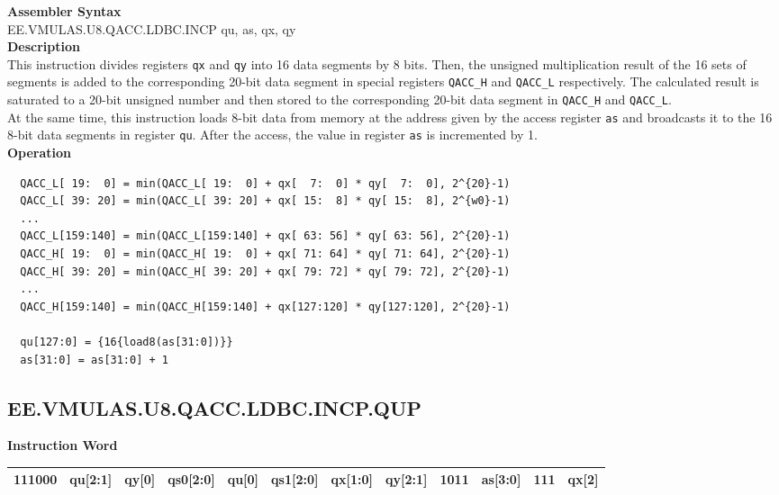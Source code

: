 \textbf{Assembler Syntax} \\
EE.VMULAS.U8.QACC.LDBC.INCP qu, as, qx, qy \\
\textbf{Description} \\
This instruction divides registers \lstinline{qx} and \lstinline{qy} into 16 data segments by 8 bits. Then, the unsigned multiplication result of the 16 sets of segments is added to the corresponding 20-bit data segment in special registers \lstinline{QACC_H} and \lstinline{QACC_L} respectively. The calculated result is saturated to a 20-bit unsigned number and then stored to the corresponding 20-bit data segment in \lstinline{QACC_H} and \lstinline{QACC_L}.\\
At the same time, this instruction loads 8-bit data from memory at the address given by the access register \lstinline{as} and broadcasts it to the 16 8-bit data segments in register \lstinline{qu}. After the access, the value in register \lstinline{as} is incremented by 1.\\
\textbf{Operation}
\begin{lstlisting}
  QACC_L[ 19:  0] = min(QACC_L[ 19:  0] + qx[  7:  0] * qy[  7:  0], 2^{20}-1)
  QACC_L[ 39: 20] = min(QACC_L[ 39: 20] + qx[ 15:  8] * qy[ 15:  8], 2^{w0}-1)
  ...
  QACC_L[159:140] = min(QACC_L[159:140] + qx[ 63: 56] * qy[ 63: 56], 2^{20}-1)
  QACC_H[ 19:  0] = min(QACC_H[ 19:  0] + qx[ 71: 64] * qy[ 71: 64], 2^{20}-1)
  QACC_H[ 39: 20] = min(QACC_H[ 39: 20] + qx[ 79: 72] * qy[ 79: 72], 2^{20}-1)
  ...
  QACC_H[159:140] = min(QACC_H[159:140] + qx[127:120] * qy[127:120], 2^{20}-1)

  qu[127:0] = {16{load8(as[31:0])}}
  as[31:0] = as[31:0] + 1
\end{lstlisting}

\clearpage
\subsection{EE.VMULAS.U8.QACC.LDBC.INCP.QUP}\label{instruction:EEVMULASU8QACCLDBCINCPQUP}
\setlength\tabcolsep{6pt}
\textbf{Instruction Word} \\
\begin{tabular}{|c|c|c|c|c|c|c|c|c|c|c|c|}
	\hline
	111000 & qu[2:1] & qy[0] & qs0[2:0] & qu[0] & qs1[2:0] & qx[1:0] & qy[2:1] & 1011 & as[3:0] & 111 & qx[2] \\
	\hline
\end{tabular}

